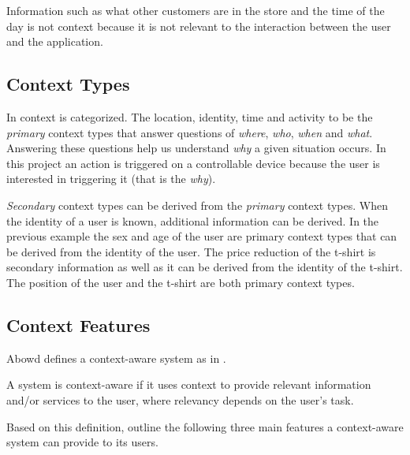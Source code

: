 Information such as what other customers are in the store and the time of the day is not context because it is not relevant to the interaction between the user and the application.

\subsection{Context Types}

In \cite{abowd1999towards} context is categorized. The location, identity, time and activity to be the \emph{primary} context types that answer questions of \emph{where}, \emph{who}, \emph{when} and \emph{what}. Answering these questions help us understand \emph{why} a given situation occurs. In this project an action is triggered on a controllable device because the user is interested in triggering it (that is the \emph{why}).

\emph{Secondary} context types can be derived from the \emph{primary} context types. When the identity of a user is known, additional information can be derived. In the previous example the sex and age of the user are primary context types that can be derived from the identity of the user. 
The price reduction of the t-shirt is secondary information as well as it can be derived from the identity of the t-shirt.
The position of the user and the t-shirt are both primary context types.

\subsection{Context Features}

Abowd \etal\cite{abowd1999towards} defines a context-aware system as in .

\begin{definition}
\label{def:context-aware}
A system is context-aware if it uses context to provide relevant information and/or services to the user, where relevancy depends on the user's task.
\end{definition}

Based on this definition, \cite{ferreira2014distributed} outline the following three main features a context-aware system can provide to its users.

